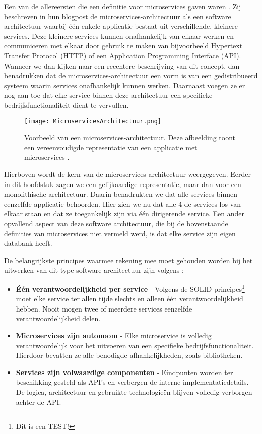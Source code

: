 Een van de allereersten die een definitie voor microservices gaven waren \textcite{Lewis2014}. Zij beschreven in hun blogpost de microservices-architectuur als een software architectuur waarbij één enkele applicatie bestaat uit verschillende, kleinere services. Deze kleinere services kunnen onafhankelijk van elkaar werken en communiceren met elkaar door gebruik te maken van bijvoorbeeld Hypertext Transfer Protocol (HTTP) of een Application Programming Interface (API). Wanneer we dan kijken naar een recentere beschrijving van dit concept, dan benadrukken \textcite{Velepucha2023} dat de microservices-architectuur een vorm is van een \hyperref[sec:distributed systems]{gedistribueerd systeem} waarin services onafhankelijk kunnen werken. Daarnaast voegen ze er nog aan toe dat elke service binnen deze architectuur een specifieke bedrijfsfunctionaliteit dient te vervullen.

\begin{figure}[H]
	\centering
	\texttt{[image: MicroservicesArchitectuur.png]}
	\caption[Voorstelling van een microservices-architectuur]{\label{fig:microservices architectuur}Voorbeeld van een microservices-architectuur. Deze afbeelding toont een vereenvoudigde representatie van een applicatie met microservices \autocite{Gos2020}.}
\end{figure}

Hierboven wordt de kern van de microservices-architectuur weergegeven. Eerder in dit hoofdstuk zagen we een gelijkaardige representatie, maar dan voor een monolithische architectuur. Daarin benadrukten we dat alle services binnen eenzelfde applicatie behoorden. Hier zien we nu dat alle 4 de services los van elkaar staan en dat ze toegankelijk zijn via één dirigerende service. Een ander opvallend aspect van deze software architectuur, die bij de bovenstaande definities van microservices niet vermeld werd, is dat elke service zijn eigen databank heeft.\newline

De belangrijkste principes waarmee rekening mee moet gehouden worden bij het uitwerken van dit type software architectuur zijn volgens \textcite{Blinowski2022}:

\begin{itemize}
	\item \textbf{Één verantwoordelijkheid per service} - Volgens de SOLID-principes\footnote{Dit is een TEST!} moet elke service ter allen tijde slechts en alleen één verantwoordelijkheid hebben. Nooit mogen twee of meerdere services eenzelfde verantwoordelijkheid delen.
	\item \textbf{Microservices zijn autonoom} - Elke microservice is volledig verantwoordelijk voor het uitvoeren van een specifieke bedrijfsfunctionaliteit. Hierdoor bevatten ze alle benodigde afhankelijkheden, zoals bibliotheken.
	\item \textbf{Services zijn volwaardige componenten} - Eindpunten worden ter beschikking gesteld als API's en verbergen de interne implementatiedetails. De logica, architectuur en gebruikte technologieën blijven volledig verborgen achter de API.
\end{itemize}

